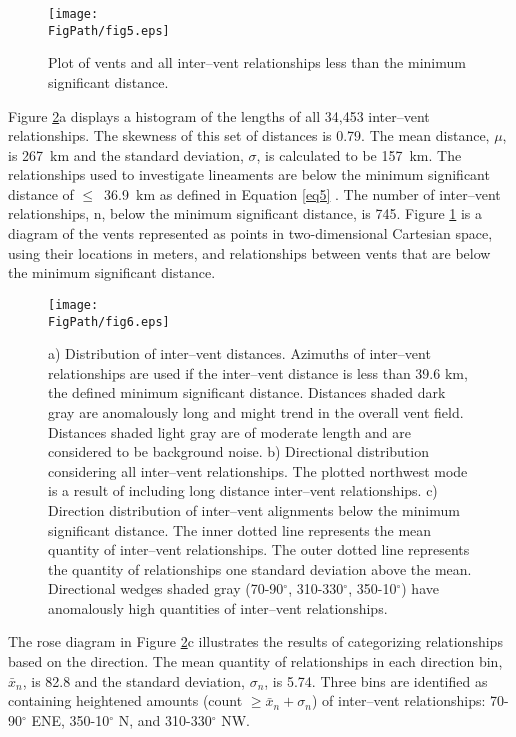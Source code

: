 \begin{figure}
\centering
\texttt{[image: \\FigPath/fig5.eps]}
\caption{Plot of vents and all inter--vent relationships less than the minimum significant distance.}
\label{fig-azmap}
\end{figure}

Figure \ref{fig-azgraphs}a displays a histogram of the lengths of all 34,453 inter--vent relationships. The skewness of this set of distances is 0.79. The mean distance, $\mu$, is 267~km and the standard deviation, $\sigma$, is calculated to be 157~km. The relationships used to investigate lineaments are below the minimum significant distance of $\le$~36.9~km as defined in Equation \ref{eq5} \citep{Cebria2011}. The number of inter--vent relationships, n, below the minimum significant distance, is 745. Figure \ref{fig-azmap} is a diagram of the vents represented as points in two-dimensional Cartesian space, using their locations in meters, and relationships between vents that are below the minimum significant distance.


\begin{figure}
\centering
\texttt{[image: \\FigPath/fig6.eps]}
\caption[Distribution of inter--vent distances and inter--vent alignments]{a) Distribution of inter--vent distances. Azimuths of inter--vent relationships are used if the inter--vent distance is less than 39.6 km, the defined minimum significant distance. Distances shaded dark gray are anomalously long and might trend in the overall vent field. Distances shaded light gray are of moderate length and are considered to be background noise. b) Directional distribution considering all inter--vent relationships. The plotted northwest mode is a result of including long distance inter--vent relationships. c) Direction distribution of inter--vent alignments below the minimum significant distance. The inner dotted line represents the mean quantity of inter--vent relationships. The outer dotted line represents the quantity of relationships one standard deviation above the mean. Directional wedges shaded gray (70-90$^{\circ}$, 310-330$^{\circ}$, 350-10$^{\circ}$) have anomalously high quantities of inter--vent relationships.}
\label{fig-azgraphs}
\end{figure}

The rose diagram in Figure \ref{fig-azgraphs}c illustrates the results of categorizing relationships based on the direction. The mean quantity of relationships in each direction bin, $\bar{x}_n$, is 82.8 and the standard deviation, $\sigma_n$, is 5.74. Three bins are identified as containing heightened amounts (count $\ge \bar{x}_n + \sigma_n$) of inter--vent relationships: 70-90$^{\circ}$ ENE, 350-10$^{\circ}$ N, and 310-330$^{\circ}$ NW.

